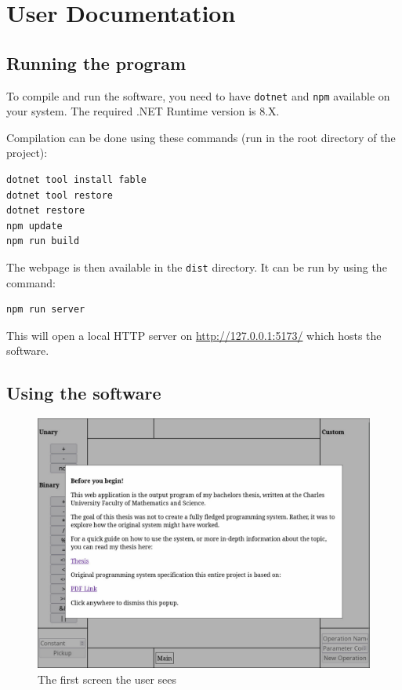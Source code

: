 \documentclass{report}
\begin{document}
\chapter*{User Documentation}

\section*{Running the program}
To compile and run the software, you need to have \texttt{dotnet} and \texttt{npm} available on your system.
The required .NET Runtime version is 8.X.

Compilation can be done using these commands (run in the root directory of the project):
\begin{verbatim}
dotnet tool install fable
dotnet tool restore
dotnet restore
npm update
npm run build
\end{verbatim}

The webpage is then available in the \texttt{dist} directory. It can be run by using the command:
\begin{verbatim}
npm run server
\end{verbatim}
This will open a local HTTP server on \url{http://127.0.0.1:5173/} which hosts the software.

\section*{Using the software}

\begin{figure}[H]
    \centering
    \includegraphics[width=1\textwidth]{img/app_intro.pdf}
    \caption{The first screen the user sees}
    \label{fig:intro}
\end{figure}
\end{document}
